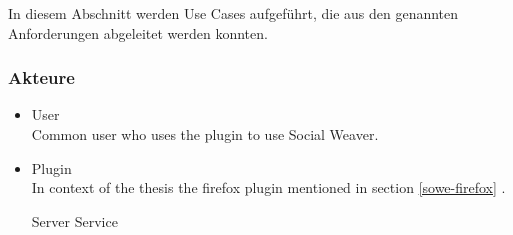 In diesem Abschnitt werden Use Cases aufgeführt, die aus den genannten Anforderungen abgeleitet werden konnten.

\subsubsection{Akteure}
\begin{itemize}
\item User \\ 
Common user who uses the plugin to use Social Weaver.

\item Plugin \\ 
In context of the thesis the firefox plugin mentioned in section \ref{sowe-firefox} .

\iterm Server Service \\ 
\end{itemize}

